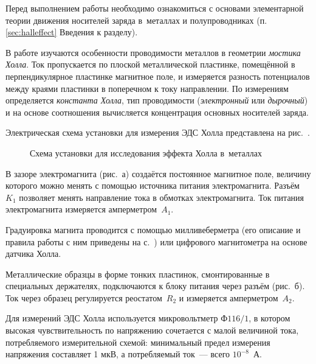 


Перед выполнением работы необходимо ознакомиться с основами
элементарной теории движения носителей заряда в~металлах и полупроводниках
(п. \ref{sec:halleffect} Введения к разделу).

В работе изучаются особенности проводимости металлов
в геометрии \emph{мостика Холла}.
Ток пропускается по плоской металлической пластинке, 
помещённой в перпендикулярное пластинке магнитное поле,
и измеряется разность потенциалов между краями пластинки в поперечном
к току направлении. По измерениям определяется \emph{константа Холла},
тип проводимости (\emph{электронный} или \emph{дырочный}) и на основе
соотношения  вычисляется концентрация основных
носителей заряда.

\experiment Электрическая схема установки для измерения ЭДС Холла представлена
на рис.~.

\begin{figure}[h!]
	\caption{Схема установки для исследования эффекта Холла в~металлах}
\end{figure}

В зазоре электромагнита (рис.~а) создаётся постоянное магнитное
поле, величину которого можно менять с помощью источника питания электромагнита.
Разъём~$K_1$ позволяет менять направление тока в обмотках электромагнита. Ток
питания электромагнита измеряется амперметром~$A_1$.

Градуировка магнита проводится с помощью милливеберметра (его описание и правила
работы с ним приведены на с.~\pageref{MWB}) или цифрового магнитометра на основе
датчика Холла.

Металлические образцы в форме тонких пластинок, смонтированные в специальных
держателях, подключаются к блоку питания через разъём (рис.~б).
Ток через образец регулируется реостатом~$R_2$ и измеряется амперметром~$A_2$.

Для измерений ЭДС Холла используется микровольтметр $\text{Ф}116/1$, в котором
высокая чувствительность по напряжению сочетается с малой величиной тока,
потребляемого измерительной схемой: минимальный предел измерения напряжения
составляет 1 мкВ, а потребляемый ток~--- всего $10^{-8}$~А.

